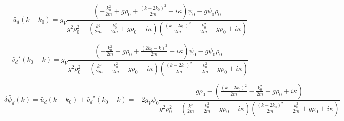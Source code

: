 \documentclass[a4paper,prb,10pt,aps]{revtex4-1}
\begin{document}
\begin{equation}
  \label{eq:37}
\widetilde{u_{d}}(k-k_{0})=g_{V}\frac{\left(-\frac{k_{0}^{2}}{2m}+g\rho_{0}+\frac{(k-2k_{0})^{2}}{2m}+i\kappa\right)\psi_{0}-g\psi_{0}\rho_{0}}{g^{2}\rho_{0}^{2}-\left(\frac{k{}^{2}}{2m}-\frac{k_{0}^{2}}{2m}+g\rho_{0}-i\kappa\right)\left(\frac{(k-2k_{0})^{2}}{2m}-\frac{k_{0}^{2}}{2m}+g\rho_{0}+i\kappa\right)}  
\end{equation}


\begin{equation}
  \label{eq:38}
\widetilde{v_{d}}^{\star}(k_{0}-k)=g_{V}\frac{\left(-\frac{k_{0}^{2}}{2m}+g\rho_{0}+\frac{(2k_{0}-k)^{2}}{2m}+i\kappa\right)\psi_{0}-g\psi_{0}\rho_{0}}{g^{2}\rho_{0}^{2}-\left(\frac{k{}^{2}}{2m}-\frac{k_{0}^{2}}{2m}+g\rho_{0}-i\kappa\right)\left(\frac{(k-2k_{0})^{2}}{2m}-\frac{k_{0}^{2}}{2m}+g\rho_{0}+i\kappa\right)}  
\end{equation}



\begin{equation}
  \label{eq:39}
\delta\widetilde{\psi_{d}}(k)=\widetilde{u_{d}}(k-k_{0})+\widetilde{v_{d}}^{\star}(k_{0}-k)  =-2g_{V}\psi_{0}\frac{g\rho_{0}-\left(\frac{(k-2k_{0})^{2}}{2m}-\frac{k_{0}^{2}}{2m}+g\rho_{0}+i\kappa\right)}{g^{2}\rho_{0}^{2}-\left(\frac{k{}^{2}}{2m}-\frac{k_{0}^{2}}{2m}+g\rho_{0}-i\kappa\right)\left(\frac{(k-2k_{0})^{2}}{2m}-\frac{k_{0}^{2}}{2m}+g\rho_{0}+i\kappa\right)}  
\end{equation}


\end{document}
